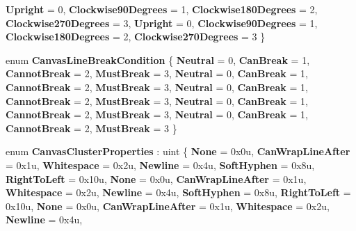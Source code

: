 \begin{DoxyCompactItemize}
\newline
{\bfseries Upright} = 0, 
{\bfseries Clockwise90\+Degrees} = 1, 
{\bfseries Clockwise180\+Degrees} = 2, 
{\bfseries Clockwise270\+Degrees} = 3, 
\newline
{\bfseries Upright} = 0, 
{\bfseries Clockwise90\+Degrees} = 1, 
{\bfseries Clockwise180\+Degrees} = 2, 
{\bfseries Clockwise270\+Degrees} = 3
 \}
\item 
\mbox{\label{namespace_microsoft_1_1_graphics_1_1_canvas_1_1_text_a8700477798bba01933c71dbfcf9029cd}} 
enum {\bfseries Canvas\+Line\+Break\+Condition} \{ \newline
{\bfseries Neutral} = 0, 
{\bfseries Can\+Break} = 1, 
{\bfseries Cannot\+Break} = 2, 
{\bfseries Must\+Break} = 3, 
\newline
{\bfseries Neutral} = 0, 
{\bfseries Can\+Break} = 1, 
{\bfseries Cannot\+Break} = 2, 
{\bfseries Must\+Break} = 3, 
\newline
{\bfseries Neutral} = 0, 
{\bfseries Can\+Break} = 1, 
{\bfseries Cannot\+Break} = 2, 
{\bfseries Must\+Break} = 3, 
\newline
{\bfseries Neutral} = 0, 
{\bfseries Can\+Break} = 1, 
{\bfseries Cannot\+Break} = 2, 
{\bfseries Must\+Break} = 3, 
\newline
{\bfseries Neutral} = 0, 
{\bfseries Can\+Break} = 1, 
{\bfseries Cannot\+Break} = 2, 
{\bfseries Must\+Break} = 3
 \}
\item 
\mbox{\label{namespace_microsoft_1_1_graphics_1_1_canvas_1_1_text_ad08119da3ea5d8ada9d9d9166a9516e7}} 
enum {\bfseries Canvas\+Cluster\+Properties} \+: uint \{ \newline
{\bfseries None} = 0x0u, 
{\bfseries Can\+Wrap\+Line\+After} = 0x1u, 
{\bfseries Whitespace} = 0x2u, 
{\bfseries Newline} = 0x4u, 
\newline
{\bfseries Soft\+Hyphen} = 0x8u, 
{\bfseries Right\+To\+Left} = 0x10u, 
{\bfseries None} = 0x0u, 
{\bfseries Can\+Wrap\+Line\+After} = 0x1u, 
\newline
{\bfseries Whitespace} = 0x2u, 
{\bfseries Newline} = 0x4u, 
{\bfseries Soft\+Hyphen} = 0x8u, 
{\bfseries Right\+To\+Left} = 0x10u, 
\newline
{\bfseries None} = 0x0u, 
{\bfseries Can\+Wrap\+Line\+After} = 0x1u, 
{\bfseries Whitespace} = 0x2u, 
{\bfseries Newline} = 0x4u, 
\newline

\end{DoxyCompactItemize}
